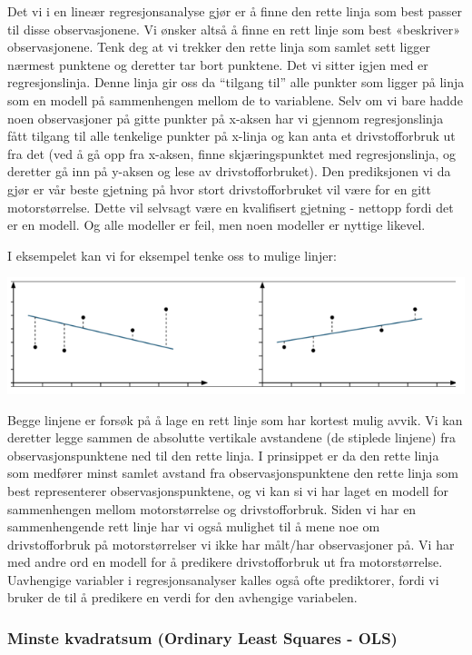 \documentclass[
]{article}
\begin{document}
Det vi i en lineær regresjonsanalyse gjør er å finne den rette linja som best passer til disse observasjonene. Vi ønsker altså å finne en rett linje som best «beskriver» observasjonene. Tenk deg at vi trekker den rette linja som samlet sett ligger nærmest punktene og deretter tar bort punktene. Det vi sitter igjen med er regresjonslinja. Denne linja gir oss da ``tilgang til'' alle punkter som ligger på linja som en modell på sammenhengen mellom de to variablene. Selv om vi bare hadde noen observasjoner på gitte punkter på x-aksen har vi gjennom regresjonslinja fått tilgang til alle tenkelige punkter på x-linja og kan anta et drivstofforbruk ut fra det (ved å gå opp fra x-aksen, finne skjæringspunktet med regresjonslinja, og deretter gå inn på y-aksen og lese av drivstofforbruket). Den prediksjonen vi da gjør er vår beste gjetning på hvor stort drivstofforbruket vil være for en gitt motorstørrelse. Dette vil selvsagt være en kvalifisert gjetning - nettopp fordi det er en modell. Og alle modeller er feil, men noen modeller er nyttige likevel.

I eksempelet kan vi for eksempel tenke oss to mulige linjer:

\includegraphics{Teori_fig3.png}

Begge linjene er forsøk på å lage en rett linje som har kortest mulig avvik. Vi kan deretter legge sammen de absolutte vertikale avstandene (de stiplede linjene) fra observasjonspunktene ned til den rette linja. I prinsippet er da den rette linja som medfører minst samlet avstand fra observasjonspunktene den rette linja som best representerer observasjonspunktene, og vi kan si vi har laget en modell for sammenhengen mellom motorstørrelse og drivstofforbruk. Siden vi har en sammenhengende rett linje har vi også mulighet til å mene noe om drivstofforbruk på motorstørrelser vi ikke har målt/har observasjoner på. Vi har med andre ord en modell for å predikere drivstofforbruk ut fra motorstørrelse. Uavhengige variabler i regresjonsanalyser kalles også ofte prediktorer, fordi vi bruker de til å predikere en verdi for den avhengige variabelen.

\hypertarget{minste-kvadratsum-ordinary-least-squares---ols}{%
\subsubsection{Minste kvadratsum (Ordinary Least Squares - OLS)}\label{minste-kvadratsum-ordinary-least-squares---ols}}
\end{document}
